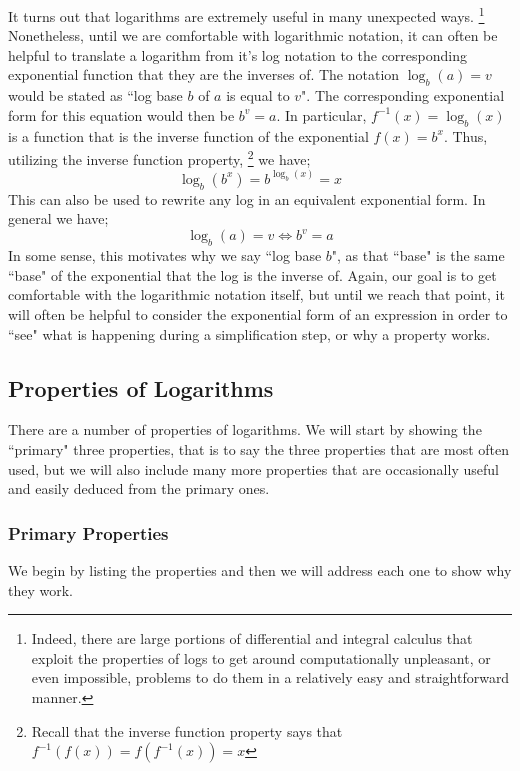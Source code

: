     It turns out that logarithms are extremely useful in many unexpected ways.%
    \footnote{Indeed, there are large portions of differential and integral calculus that exploit the properties of logs to get around computationally unpleasant, or even impossible, problems to do them in a relatively easy and straightforward manner.}
    Nonetheless, until we are comfortable with logarithmic notation, it can often be helpful to translate a logarithm from it's log notation to the corresponding exponential function that they are the inverses of. The notation $\log_b(a) = v$ would be stated as ``log base $b$ of $a$ is equal to $v$". The corresponding exponential form for this equation would then be $b^v = a$. In particular, $f^{-1}(x) = \log_b(x)$ is a function that is the inverse function of the exponential $f(x)=b^x$. Thus, utilizing the inverse function property,%
    \footnote{Recall that the inverse function property says that $f^{-1}(f(x)) = f(f^{-1}(x)) = x$}
    we have;
    \[
        \log_b(b^x) = b^{\log_b(x)} = x
    \]
    This can also be used to rewrite any log in an equivalent exponential form. In general we have;
    \[
        \log_b(a)=v \iff b^v = a
    \]
    In some sense, this motivates why we say ``log base $b$", as that ``base" is the same ``base" of the exponential that the log is the inverse of. Again, our goal is to get comfortable with the logarithmic notation itself, but until we reach that point, it will often be helpful to consider the exponential form of an expression in order to ``see" what is happening during a simplification step, or why a property works.

\subsection{Properties of Logarithms}

    There are a number of properties of logarithms. We will start by showing the ``primary" three properties, that is to say the three properties that are most often used, but we will also include many more properties that are occasionally useful and easily deduced from the primary ones.
    
    \subsubsection{Primary Properties}
        
        We begin by listing the properties and then we will address each one to show why they work.
        
